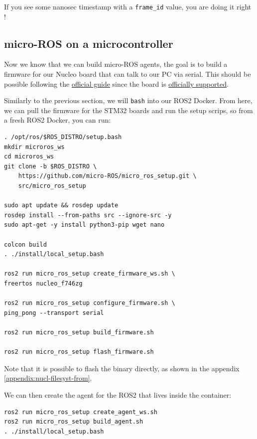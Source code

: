\documentclass[10pt]{article}
\begin{document}
If you see some nanosec timestamp with a \verb|frame_id| value, you are doing it right !

\subsection{micro-ROS on a microcontroller}
\label{sec:micro-ros-micr}
Now we know that we can build micro-ROS agents, the goal is to build a firmware for our Nucleo board that can talk to our PC via serial.
This should be possible following the \href{https://micro.ros.org/docs/tutorials/core/first_application_rtos/freertos/}{official guide} since the board is \href{https://micro.ros.org/docs/overview/hardware/}{officially supported}.


Similarly to the previous section, we will \verb|bash| into our ROS2 Docker. From here, we can  pull the firmware for the STM32 boards and run the setup scrips, so from a fresh ROS2 Docker, you can run:
\begin{tcolorbox}
\begin{verbatim}
. /opt/ros/$ROS_DISTRO/setup.bash
mkdir microros_ws
cd microros_ws
git clone -b $ROS_DISTRO \
    https://github.com/micro-ROS/micro_ros_setup.git \
    src/micro_ros_setup

sudo apt update && rosdep update
rosdep install --from-paths src --ignore-src -y
sudo apt-get -y install python3-pip wget nano

colcon build
. ./install/local_setup.bash

ros2 run micro_ros_setup create_firmware_ws.sh \
freertos nucleo_f746zg

ros2 run micro_ros_setup configure_firmware.sh \
ping_pong --transport serial

ros2 run micro_ros_setup build_firmware.sh

ros2 run micro_ros_setup flash_firmware.sh
\end{verbatim}
\end{tcolorbox}
Note that it is possible to flash the binary directly, as shown in the appendix \ref{appendix:nucl-filesyst-from}.

We can then create the agent for the ROS2 that lives inside the container:
\begin{tcolorbox}
\begin{verbatim}
ros2 run micro_ros_setup create_agent_ws.sh
ros2 run micro_ros_setup build_agent.sh
. ./install/local_setup.bash
\end{verbatim}
\end{tcolorbox}
\end{document}
